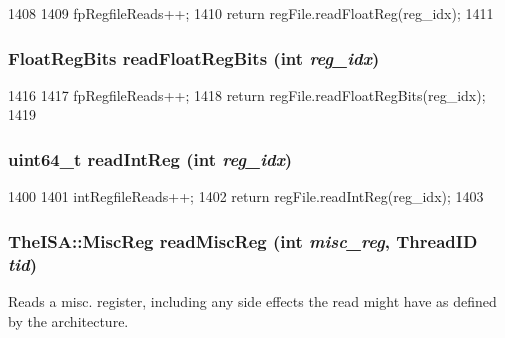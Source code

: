 \begin{DoxyCode}
1408 {
1409     fpRegfileReads++;
1410     return regFile.readFloatReg(reg_idx);
1411 }
\end{DoxyCode}
\hypertarget{classFullO3CPU_a4998e6615f835676762af364eff198e3}{
\subsubsection[{readFloatRegBits}]{\setlength{\rightskip}{0pt plus 5cm}FloatRegBits readFloatRegBits (int {\em reg\_\-idx})}}
\label{classFullO3CPU_a4998e6615f835676762af364eff198e3}



\begin{DoxyCode}
1416 {
1417     fpRegfileReads++;
1418     return regFile.readFloatRegBits(reg_idx);
1419 }
\end{DoxyCode}
\hypertarget{classFullO3CPU_a21c850cd41ab977a2cf3450fe66ec25a}{
\subsubsection[{readIntReg}]{\setlength{\rightskip}{0pt plus 5cm}uint64\_\-t readIntReg (int {\em reg\_\-idx})}}
\label{classFullO3CPU_a21c850cd41ab977a2cf3450fe66ec25a}



\begin{DoxyCode}
1400 {
1401     intRegfileReads++;
1402     return regFile.readIntReg(reg_idx);
1403 }
\end{DoxyCode}
\hypertarget{classFullO3CPU_ae9d0992c10f59b8dc47ea56b3a778c32}{
\subsubsection[{readMiscReg}]{\setlength{\rightskip}{0pt plus 5cm}TheISA::MiscReg readMiscReg (int {\em misc\_\-reg}, \/  {\bf ThreadID} {\em tid})}}
\label{classFullO3CPU_ae9d0992c10f59b8dc47ea56b3a778c32}
Reads a misc. register, including any side effects the read might have as defined by the architecture. 


